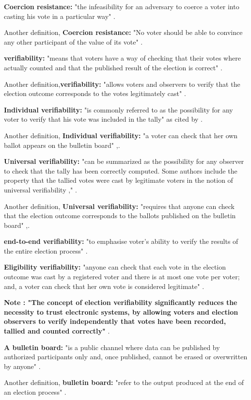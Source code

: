 \textbf{Coercion resistance:} "the infeasibility for an adversary to coerce a voter into casting his vote in a particular way" \cite{S5}.

Another definition, \textbf{Coercion resistance:} "No voter should be able to convince any other participant of the value of its vote" \cite{S9}.


\textbf{verifiability:} "means that voters have a way of checking that their votes where actually counted and that the published result of the election is correct" \cite{S8}.


Another definition,\textbf{veriﬁability:} "allows voters and observers to verify that the election outcome corresponds to the votes legitimately cast" \cite{S10}.


\textbf{Individual verifiability:} "is commonly referred to as the possibility for any voter to verify that his vote was included in the tally" as cited by \cite{S5}.


Another definition, \textbf{Individual verifiability:} "a voter can check that her own ballot appears on the bulletin board" \cite{S8},\cite{S10}. 

\textbf{Universal verifiability: } "can be summarized as the possibility for any observer to check that the tally has been correctly computed. Some authors include the property that the tallied votes were cast by legitimate voters in the notion of universal verifiability  \cite{S6},\cite{S7}"  \cite{S5}.


Another definition, \textbf{Universal verifiability: } "requires that anyone can check that the election outcome corresponds to the ballots published on the bulletin board" \cite{S8},\cite{S10}.

\textbf{end-to-end verifiability:} "to emphasise voter's ability to verify the results of the entire election process" \cite{S10}.

\textbf{Eligibility veriﬁability:} "anyone can check that each vote in the election outcome was cast by a registered voter and there is at most one vote per voter; and, a voter can check that her own vote is considered legitimate" \cite{S10}.



\textbf{Note : "The concept of election veriﬁability signiﬁcantly reduces the necessity to trust electronic systems, by allowing voters and election observers to verify independently that votes have been recorded, tallied and counted correctly"} \cite{S10}. 

\textbf{A bulletin board:} "is a public channel where data can be published by authorized participants only and, once published, cannot be erased or overwritten by anyone" \cite{S5}.

Another definition, \textbf{bulletin board:} "refer to the output produced at the end of an election process" \cite{S10}.






